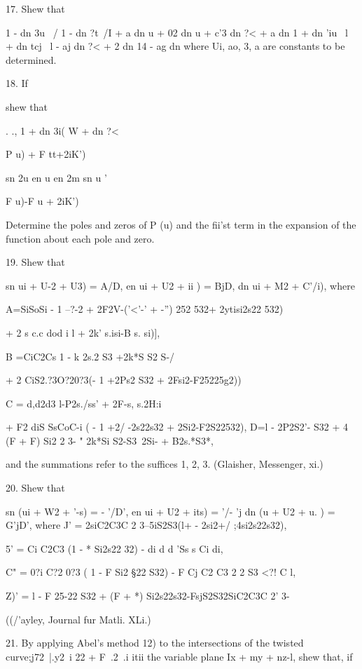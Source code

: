 17. Shew that

1 - dn 3u \ / 1 - dn ?t\ /I + a dn u + 02 dn u + c'3 dn ?< + a dn 1 +
dn 'iu \ l + dn tcj \ l - aj dn ?< + 2 dn 14 - ag dn %
where Ui, ao, 3, a are constants to be determined. 

18. If

shew that

  . ., 1 + dn 3i( W + dn ?<

P u) + F tt+2iK')

sn 2u en u en 2m sn u '

F u)-F u + 2iK')

Determine the poles and zeros of P (u) and the fii'st term in the
expansion of the function about each pole and zero.


19. Shew that

sn ui + U-2 + U3) = A/D, en ui + U2 + ii ) = BjD, dn ui + M2 + %
C'/i), where

A=SiSoSi - 1 --?-2 + 2F2V-('<'-' + -'') 252 532+ 2ytisi2s22 532)

+ 2 s c.c dod i l + 2k' s.isi-B s. si)],

B =CiC2Cs 1 - k 2s.2 S3 +2k*S S2 S-/

+ 2 CiS2.?3O?20?3(- 1 +2Ps2 S32 + 2Fsi2-F25225g2))

C = d,d2d3 l-P2s./ss' + 2F-s, s.2H:i

+ F2 diS SsCoC-i ( - 1 +2/ -2s22s32 + 2Si2-F2S22532), D=l - 2P2S2'-
S32 + 4 (F + F) Si2 2 3- " 2k*Si S2-S3~2Si- + B2s.*S3*,

and the summations refer to the suffices 1, 2, 3. (Glaisher,
Messenger, xi.)

20. Shew that

sn (ui + W2 + '-s) = - '/D', en ui + U2 + its) = '/- 'j dn (u + U2 +
u. ) = G'jD', where J' = 2siC2C3C 2 3--5iS2S3(l+ - 2si2+/
;4si2s22s32),

5' = Ci C2C3 (1 - * Si2s22 32) - di d d 'Ss s Ci di,

C" = 0?i C?2 0?3 ( 1 - F Si2 §22 S32) - F Cj C2 C3 2 2 S3 <?! C l,

Z)' = l - F 25-22 S32 + (F + *) Si2s22s32-FsjS2S32SiC2C3C 2' 3-

((/'ayley, Journal fur Matli. XLi.)

21. By applying Abel's method  12) to the intersections of the
twisted curve;j72\ |.y2\ i 22 + F\ .2\ .i itii the variable plane Ix
+ my + nz-l, shew that, if

